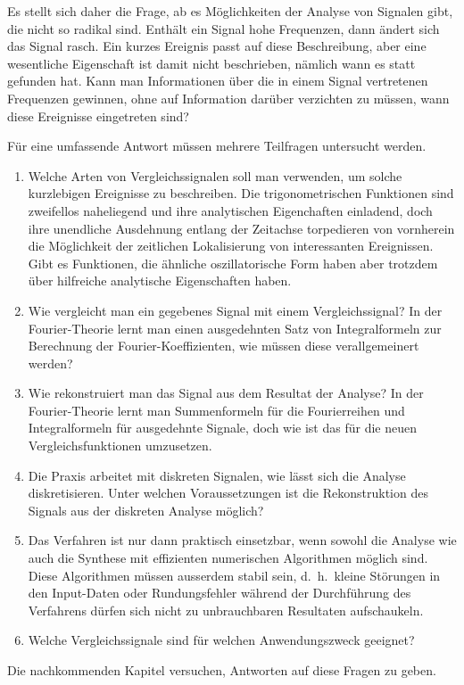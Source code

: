 Es stellt sich daher die Frage, ab es Möglichkeiten der Analyse von Signalen
gibt, die nicht so radikal sind.
Enthält ein Signal hohe Frequenzen, dann ändert sich das Signal rasch.
Ein kurzes Ereignis passt auf diese Beschreibung, aber eine wesentliche
Eigenschaft ist damit nicht beschrieben, nämlich wann es statt gefunden hat.
Kann man Informationen über die in einem Signal vertretenen Frequenzen gewinnen,
ohne auf Information darüber verzichten zu müssen, wann diese Ereignisse
eingetreten sind?

Für eine umfassende Antwort müssen mehrere Teilfragen untersucht werden.
\begin{enumerate}
\item
Welche Arten von Vergleichssignalen soll man verwenden, um solche kurzlebigen
Ereignisse zu beschreiben.
Die trigonometrischen Funktionen sind zweifellos naheliegend und ihre
analytischen Eigenchaften einladend, doch ihre unendliche Ausdehnung entlang
der Zeitachse torpedieren von vornherein die Möglichkeit der zeitlichen
Lokalisierung von interessanten Ereignissen.
Gibt es Funktionen, die ähnliche oszillatorische Form haben
aber trotzdem über hilfreiche analytische Eigenschaften haben.
\item
Wie vergleicht man ein gegebenes Signal mit einem Vergleichssignal?
In der Fourier-Theorie lernt man einen ausgedehnten Satz von Integralformeln
zur Berechnung der Fourier-Koeffizienten, wie müssen diese verallgemeinert
werden?
\item
Wie rekonstruiert man das Signal aus dem Resultat der Analyse?
In der Fourier-Theorie lernt man Summenformeln für die Fourierreihen
und Integralformeln für ausgedehnte Signale, doch wie ist das für 
die neuen Vergleichsfunktionen umzusetzen.
\item
Die Praxis arbeitet mit diskreten Signalen, wie lässt sich die Analyse
diskretisieren.
Unter welchen Voraussetzungen ist die Rekonstruktion des Signals
aus der diskreten Analyse möglich?
\item
Das Verfahren ist nur dann praktisch einsetzbar, wenn sowohl die Analyse wie
auch die Synthese mit effizienten numerischen Algorithmen möglich sind.
Diese Algorithmen müssen ausserdem stabil sein, d.~h.~kleine Störungen in
den Input-Daten oder Rundungsfehler während der Durchführung des Verfahrens
dürfen sich nicht zu unbrauchbaren Resultaten aufschaukeln.
\item
Welche Vergleichssignale sind für welchen Anwendungszweck geeignet?
\end{enumerate}
Die nachkommenden Kapitel versuchen, Antworten auf diese Fragen zu
geben.

